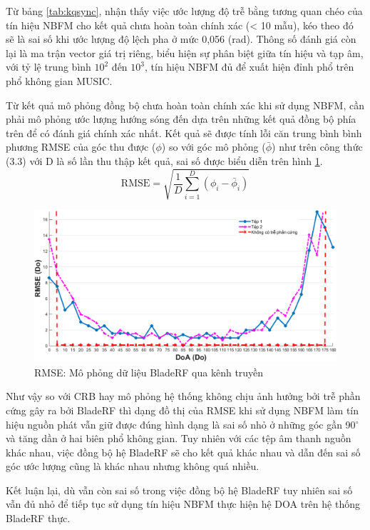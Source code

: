 Từ bảng \ref{tab:kqsync}, nhận thấy việc ước lượng độ trễ bằng tương quan chéo của tín hiệu NBFM cho kết quả chưa hoàn toàn chính xác (< 10 mẫu), kéo theo đó sẽ là sai số khi ước lượng độ lệch pha ở mức 0,056 (rad). Thông số đánh giá còn lại là ma trận vector giá trị riêng, biểu hiện sự phân biệt giữa tín hiệu và tạp âm, với tỷ lệ trung bình $10^2$ đến $10^3$, tín hiệu NBFM đủ để xuất hiện đỉnh phổ trên phổ không gian MUSIC.

Từ kết quả mô phỏng đồng bộ chưa hoàn toàn chính xác khi sử dụng NBFM, cần phải mô phỏng ước lượng hướng sóng đến dựa trên những kết quả đồng bộ phía trên để có đánh giá chính xác nhất. Kết quả sẽ được tính lỗi căn trung bình bình phương RMSE của góc thu được ($\phi$) so với góc mô phỏng ($\bar{\phi}$) như trên công thức (3.3) với D là số lần thu thập kết quả, sai số được biểu diễn trên hình \ref{fig:kqnbfm}.
\begin{equation}
	\mathrm{RMSE} = \sqrt{\frac{1}{D}\sum_{i=1}^{D}(\phi_i - \bar{\phi}_i)} 
\end{equation}

\begin{figure} [!ht]
	\centering
	\includegraphics[width=1\linewidth]{figures/kqnbfm.png}
	\caption{RMSE: Mô phỏng dữ liệu BladeRF qua kênh truyền}
	\label{fig:kqnbfm}
\end{figure}

Như vậy so với CRB hay mô phỏng hệ thống không chịu ảnh hưởng bởi trễ phần cứng gây ra bởi BladeRF thì dạng đồ thị của RMSE khi sử dụng NBFM làm tín hiệu nguồn phát vẫn giữ được đúng hình dạng là sai số nhỏ ở những góc gần 90$^{\circ}$ và tăng dần ở hai biên phổ không gian. Tuy nhiên với các tệp âm thanh nguồn khác nhau, việc đồng bộ hệ BladeRF sẽ cho kết quả khác nhau và dẫn đến sai số góc ước lượng cũng là khác nhau nhưng không quá nhiều.

Kết luận lại, dù vẫn còn sai số trong việc đồng bộ hệ BladeRF tuy nhiên sai số vẫn đủ nhỏ để tiếp tục sử dụng tín hiệu NBFM thực hiện hệ DOA trên hệ thống BladeRF thực.


